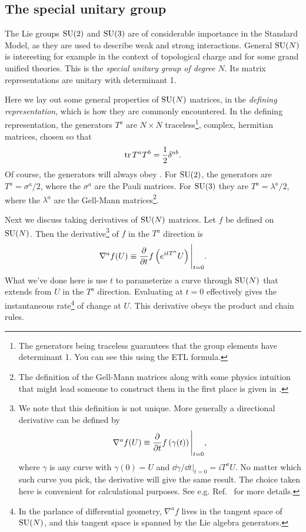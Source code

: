 \subsection{The special unitary group}

The Lie groups $\operatorname{SU}(2)$ and $\operatorname{SU}(3)$ are of considerable importance in the
Standard Model, as they are used to describe weak and strong interactions.
General $\operatorname{SU}(N)$ is interesting for example
in the context of topological charge and for some grand unified theories.
This is the 
{\it special unitary group of degree $N$}. Its matrix
representations are unitary with determinant 1.

Here we lay out some general properties of $\operatorname{SU}(N)$ matrices,
in the {\it defining representation},
which is how they are commonly encountered.
In the defining representation, the generators $T^a$ are $N\times N$
traceless\footnote{The generators being traceless guarantees
that the group elements have determinant 1. You can see this using 
the ETL formula.}, complex, hermitian matrices, chosen so that
\begin{equation}\label{eq:SUNnorm}
\tr T^a T^b=\frac{1}{2}\delta^{ab}.
\end{equation}
Of course, the generators will always obey .
For $\operatorname{SU}(2)$, the generators are $T^a=\sigma^a/2$, where the $\sigma^a$ are
the Pauli matrices. For
$\operatorname{SU}(3)$ they are $T^a=\lambda^a/2$, where the $\lambda^a$ are the Gell-Mann
matrices\footnote{The definition
of the Gell-Mann matrices along with some physics intuition that
might lead someone to construct them in the first place
is given in .}.

Next we discuss taking derivatives of $\operatorname{SU}(N)$ matrices.
Let $f$ be defined on $\operatorname{SU}(N)$. Then the 
derivative\footnote{We note that this definition is not unique.
More generally a directional derivative can be defined by
$$
\nabla^af(U)\equiv\pdv{}{t}f\left(\gamma(t)\right)\Bigg|_{t=0},
$$
where $\gamma$ is any curve with $\gamma(0)=U$ and
$\dd\gamma/\dd t|_{t=0}=iT^aU$. No matter which such curve you pick,
the derivative will give the same result. The choice taken here
is convenient for calculational purposes.
See e.g. Ref.~\cite{hall_lie_2003} for more details.
}
of $f$ in the $T^a$ direction is
\begin{equation}\label{eq:lieDeriv}
\nabla^af(U)\equiv\pdv{}{t}f\left(e^{itT^a}U\right)\Bigg|_{t=0}.
\end{equation}
What we've done here is use $t$ to parameterize a curve through $\operatorname{SU}(N)$ that
extends from $U$ in the $T^a$ direction. Evaluating at $t=0$
effectively gives the instantaneous rate\footnote{In the parlance
of differential geometry, $\nabla^a f$ lives in the tangent space
of $\operatorname{SU}(N)$, and this tangent space is spanned by the Lie algebra generators.} 
of change at $U$. This derivative obeys the product and chain rules.

